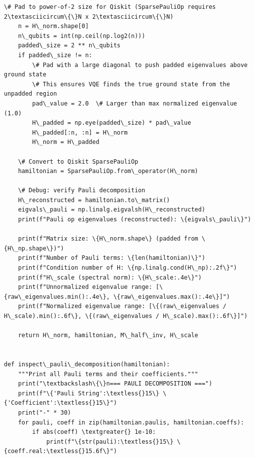\documentclass[12pt, a4paper]{article}
\begin{document}
\begin{lstlisting}[style=codestyle, caption={{quantum_setup.py --- Hamiltonian Construction}}]
    \# Pad to power-of-2 size for Qiskit (SparsePauliOp requires 2\textasciicircum\{\}N x 2\textasciicircum\{\}N)
    n = H\_norm.shape[0]
    n\_qubits = int(np.ceil(np.log2(n)))
    padded\_size = 2 ** n\_qubits
    if padded\_size != n:
        \# Pad with a large diagonal to push padded eigenvalues above ground state
        \# This ensures VQE finds the true ground state from the unpadded region
        pad\_value = 2.0  \# Larger than max normalized eigenvalue (1.0)
        H\_padded = np.eye(padded\_size) * pad\_value
        H\_padded[:n, :n] = H\_norm
        H\_norm = H\_padded

    \# Convert to Qiskit SparsePauliOp
    hamiltonian = SparsePauliOp.from\_operator(H\_norm)

    \# Debug: verify Pauli decomposition
    H\_reconstructed = hamiltonian.to\_matrix()
    eigvals\_pauli = np.linalg.eigvalsh(H\_reconstructed)
    print(f"Pauli op eigenvalues (reconstructed): \{eigvals\_pauli\}")

    print(f"Matrix size: \{H\_norm.shape\} (padded from \{H\_np.shape\})")
    print(f"Number of Pauli terms: \{len(hamiltonian)\}")
    print(f"Condition number of H: \{np.linalg.cond(H\_np):.2f\}")
    print(f"H\_scale (spectral norm): \{H\_scale:.4e\}")
    print(f"Unnormalized eigenvalue range: [\{raw\_eigenvalues.min():.4e\}, \{raw\_eigenvalues.max():.4e\}]")
    print(f"Normalized eigenvalue range: [\{(raw\_eigenvalues / H\_scale).min():.6f\}, \{(raw\_eigenvalues / H\_scale).max():.6f\}]")

    return H\_norm, hamiltonian, M\_half\_inv, H\_scale


def inspect\_pauli\_decomposition(hamiltonian):
    """Print all Pauli terms and their coefficients."""
    print("\textbackslash\{\}n=== PAULI DECOMPOSITION ===")
    print(f"\{'Pauli String':\textless{}15\} \{'Coefficient':\textless{}15\}")
    print("-" * 30)
    for pauli, coeff in zip(hamiltonian.paulis, hamiltonian.coeffs):
        if abs(coeff) \textgreater{} 1e-10:
            print(f"\{str(pauli):\textless{}15\} \{coeff.real:\textless{}15.6f\}")

\end{lstlisting}

\end{document}
